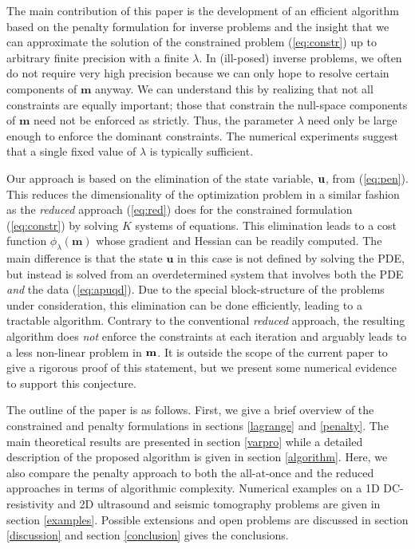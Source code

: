 \documentclass{iopart}
\begin{document}
The main contribution of this paper is the development of an efficient algorithm based on the penalty formulation for inverse problems and the insight that we can approximate the solution of the constrained problem (\ref{eq:constr}) up to arbitrary finite precision with a finite $\lambda$. In (ill-posed) inverse problems, we often do not require very high precision because we can only hope to resolve certain components of $\mathbf{m}$ anyway. We can understand this by realizing that not all constraints are equally important; those that constrain the null-space components of $\mathbf{m}$ need not be enforced as strictly. Thus, the parameter $\lambda$ need only be large enough to enforce the dominant constraints. The numerical experiments suggest that a single fixed value of $\lambda$ is typically sufficient.

Our approach is based on the elimination of the state variable, $\mathbf{u}$, from (\ref{eq:pen}). This reduces the dimensionality of the optimization problem in a similar fashion as the \emph{reduced} approach (\ref{eq:red}) does for the constrained formulation (\ref{eq:constr}) by solving $K$ systems of equations. This elimination leads to a cost function $\phi_{\lambda}(\mathbf{m})$ whose gradient and Hessian can be readily computed. The main difference is that the state $\mathbf{u}$ in this case is not defined by solving the PDE, but instead is solved from an overdetermined system that involves both the PDE \emph{and} the data (\ref{eq:apuqd}). Due to the special block-structure of the problems under consideration, this elimination can be done efficiently, leading to a tractable algorithm. Contrary to the conventional \emph{reduced} approach, the resulting algorithm does \emph{not} enforce the constraints at each iteration and arguably leads to a less non-linear problem in $\mathbf{m}$. It is outside the scope of the current paper to give a rigorous proof of this statement, but we present some numerical evidence to support this conjecture.

The outline of the paper is as follows. First, we give a brief overview of the constrained and penalty formulations in sections \ref{lagrange} and \ref{penalty}. The main theoretical results are presented in section \ref{varpro} while a detailed description of the proposed algorithm is given in section \ref{algorithm}. Here, we also compare the penalty approach to both the all-at-once and the reduced approaches in terms of algorithmic complexity. Numerical examples on a 1D DC-resistivity and 2D ultrasound and seismic tomography problems are given in section \ref{examples}. Possible extensions and open problems are discussed in section \ref{discussion} and section \ref{conclusion} gives the conclusions.
\end{document}
